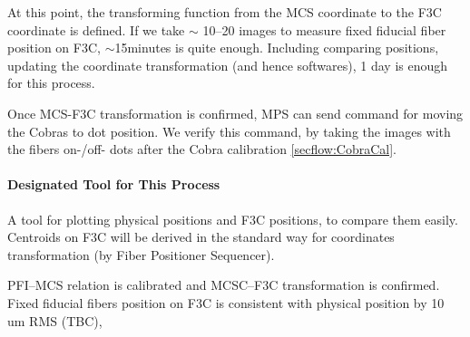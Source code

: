 At this point, the transforming function from the MCS coordinate to the F3C coordinate is defined.
If we take $\sim$ 10--20 images to measure fixed fiducial fiber position on F3C, $\sim$15minutes  is quite enough. 
Including comparing positions, updating the coordinate transformation (and hence softwares), 1 day is enough for this process.

Once MCS-F3C transformation is confirmed, MPS can send command for moving the Cobras to dot position.
We verify this command, by taking the images with the fibers on-/off- dots after the Cobra calibration \ref{secflow:CobraCal}.

\paragraph{Designated Tool for This Process}
A tool for plotting physical positions and F3C positions, to compare them easily.
Centroids on F3C will be derived in the standard way for coordinates transformation (by Fiber Positioner Sequencer).

\begin{itembox}[l]{}
PFI--MCS relation is calibrated and MCSC--F3C transformation is confirmed. \\
Fixed fiducial fibers position on F3C is consistent with physical position by 10 um RMS (TBC), 

\end{itembox}